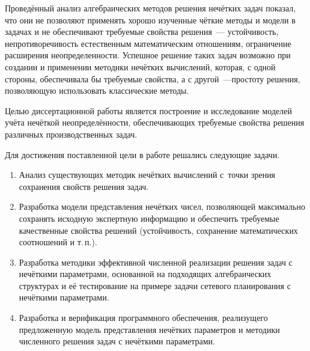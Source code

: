 Проведённый анализ алгебраических методов решения нечётких задач показал, что они не позволяют применять хорошо изученные чёткие методы и модели в задачах и не обеспечивают требуемые свойства решения~--- устойчивость, непротиворечивость естественным математическим отношениям, ограничение расширения неопределенности. Успешное решение таких задач возможно при создании и применении методики нечётких вычислений, которая, с одной стороны, обеспечивала бы требуемые свойства, а с другой~---простоту решения, позволяющую использовать классические методы.



Целью диссертационной работы является построение и исследование моделей учёта нечёткой неопределённости, обеспечивающих требуемые свойства решения различных производственных задач.

Для достижения поставленной цели в работе решались следующие задачи.
\begin{enumerate}
  \item Анализ существующих методик нечётких вычислений с~точки зрения сохранения свойств решения задач.
  \item Разработка модели представления нечётких чисел, позволяющей максимально сохранять исходную экспертную информацию и обеспечить требуемые качественные свойства решений (устойчивость, сохранение математических соотношений и т.\,п.).
  \item Разработка методики эффективной численной реализации решения задач с нечёткими параметрами, основанной на подходящих алгебраических структурах и её тестирование на примере задачи сетевого планирования с нечёткими параметрами.
  \item Разработка и верификация программного обеспечения, реализущего предложенную модель представления нечётких параметров и методики численного решения задач с нечёткими параметрами.
\end{enumerate}